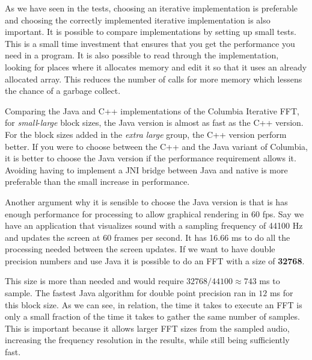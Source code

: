 
As we have seen in the tests, choosing an iterative implementation is preferable and choosing the correctly implemented iterative implementation is also important. It is possible to compare implementations by setting up small tests. This is a small time investment that ensures that you get the performance you need in a program. It is also possible to read through the implementation, looking for places where it allocates memory and edit it so that it uses an already allocated array. This reduces the number of calls for more memory which lessens the chance of a garbage collect.

Comparing the Java and C++ implementations of the Columbia Iterative FFT, for \emph{small}-\emph{large} block sizes, the Java version is almost as fast as the C++ version. For the block sizes added in the \emph{extra large} group, the C++ version perform better. If you were to choose between the C++ and the Java variant of Columbia, it is better to choose the Java version if the performance requirement allows it. Avoiding having to implement a JNI bridge between Java and native is more preferable than the small increase in performance.

Another argument why it is sensible to choose the Java version is that is has enough performance for processing to allow graphical rendering in 60 \gls{fps}. Say we have an application that visualizes sound with a sampling frequency of 44100 Hz and updates the screen at 60 frames per second. It has 16.66 ms to do all the processing needed between the screen updates. If we want to have double precision numbers and use Java it is possible to do an FFT with a size of \textbf{32768}.


This size is more than needed and would require $32768/44100\approx 743 $ ms to sample. The fastest Java algorithm for double point precision ran in $12$ ms for this block size. As we can see, in relation, the time it takes to execute an FFT is only a small fraction of the time it takes to gather the same number of samples. This is important because it allows larger FFT sizes from the sampled audio, increasing the frequency resolution in the results, while still being sufficiently fast.

